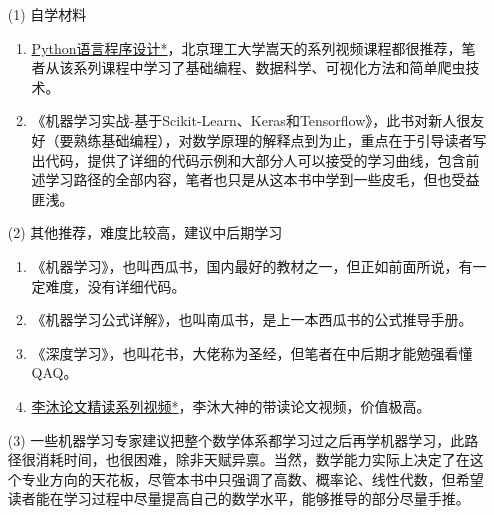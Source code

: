 \documentclass[a5paper, 11pt]{ctexbook}
\begin{document}
\begin{enumerate}
    \item[(1)] 自学材料
        \begin{enumerate}
            \item \href{https://www.bilibili.com/video/BV1JF411L7SD}{Python语言程序设计*}，北京理工大学嵩天的系列视频课程都很推荐，笔者从该系列课程中学习了基础编程、数据科学、可视化方法和简单爬虫技术。\label{视频课程}
            \item 《机器学习实战-基于Scikit-Learn、Keras和Tensorflow》，此书对新人很友好（要熟练基础编程），对数学原理的解释点到为止，重点在于引导读者写出代码，提供了详细的代码示例和大部分人可以接受的学习曲线，包含前述学习路径的全部内容，笔者也只是从这本书中学到一些皮毛，但也受益匪浅。
        \end{enumerate}
    \item[(2)] 其他推荐，难度比较高，建议中后期学习
        \begin{enumerate}
            \item 《机器学习》，也叫西瓜书，国内最好的教材之一，但正如前面所说，有一定难度，没有详细代码。
            \item 《机器学习公式详解》，也叫南瓜书，是上一本西瓜书的公式推导手册。
            \item 《深度学习》，也叫花书，大佬称为圣经，但笔者在中后期才能勉强看懂QAQ。
            \item \href{https://www.bilibili.com/video/BV1H44y1t75x}{李沐论文精读系列视频*}，李沐大神的带读论文视频，价值极高。
        \end{enumerate}
    \item[(3)] 一些机器学习专家建议把整个数学体系都学习过之后再学机器学习，此路径很消耗时间，也很困难，除非天赋异禀。当然，数学能力实际上决定了在这个专业方向的天花板，尽管本书中只强调了高数、概率论、线性代数，但希望读者能在学习过程中尽量提高自己的数学水平，能够推导的部分尽量手推。
\end{enumerate}
\end{document}
